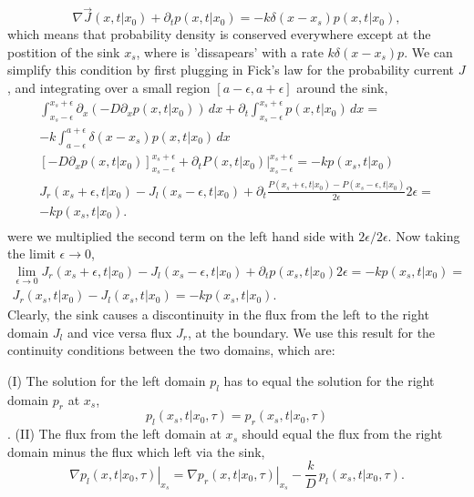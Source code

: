 \begin{equation}
 \nabla \vec{J}(x,t|x_0) + \partial_t p(x,t|x_0) = -k \delta( x - x_s ) p(x,t|x_0),
\end{equation}
which means that probability density is conserved everywhere except at the postition of the sink $x_s$, where is 'dissapears' with a rate $k \delta ( x - x_s ) p$. We can simplify this condition by first plugging in Fick's law for the probability current $J$, and integrating over a small region $[a - \epsilon,a + \epsilon]$ around the sink, 
\begin{gather}
\int_{x_s - \epsilon}^{x_s + \epsilon} \partial_x \left( -D \partial_x p(x,t|x_0)  \right) \, dx + \partial_t \int_{x_s - \epsilon}^{x_s + \epsilon} p(x,t|x_0) \, dx = \nonumber \\
-k \int_{a - \epsilon}^{a + \epsilon} \delta( x - x_s ) p(x,t|x_0) \, dx \nonumber \\
\left[ -D \partial_x p(x,t|x_0)  \right]_{x_s - \epsilon}^{x_s + \epsilon} + \partial_t \left. P(x,t|x_0) \right|_{x_s - \epsilon}^{x_s + \epsilon} = -k p(x_s,t|x_0) \nonumber \\
J_r(x_s + \epsilon,t|x_0) - J_l(x_s - \epsilon,t|x_0) + \partial_t \frac{P(x_s + \epsilon,t|x_0) - P(x_s - \epsilon,t|x_0)}{2 \epsilon} 2\epsilon = \nonumber \\ 
-k p(x_s,t|x_0). \nonumber \\
\end{gather}
were we multiplied the second term on the left hand side with $2\epsilon/2\epsilon$. Now taking the limit $\epsilon \rightarrow 0$,
\begin{gather}
 \lim_{\epsilon \to 0} J_r(x_s + \epsilon,t|x_0) - J_l(x_s - \epsilon,t|x_0) + \partial_t p(x_s,t|x_0) 2\epsilon = -k p(x_s,t|x_0) \nonumber = \\
 J_r(x_s,t|x_0) - J_l(x_s,t|x_0) = -k p(x_s,t|x_0).
\end{gather}
Clearly, the sink causes a discontinuity in the flux from the left to the right domain $J_l$ and vice versa flux $J_r$, at the boundary. We use this result for the continuity conditions between the two domains, which are:

(I) The solution for the left domain $p_l$ has to equal the solution for the right domain $p_r$ at $x_s$,
\begin{equation} 
 p_l(x_s,t|x_0,\tau) = p_r(x_s,t|x_0,\tau) 
\end{equation}.
(II) The flux from the left domain at $x_s$ should equal the flux from the right domain minus the flux which left via the sink,
\begin{equation} 
 \left. \nabla p_l(x,t|x_0,\tau) \right|_{x_s} = \left. \nabla p_r(x,t|x_0,\tau) \right|_{x_s} - \frac{k}{D} \, p_{l}(x_s,t|x_0,\tau).
\end{equation}

